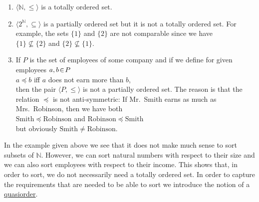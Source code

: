 \examples
\begin{enumerate}
\item $\langle\mathbb{N}, \leq \rangle$ is a totally ordered set.
\item $\langle 2^{\mathbb{N}}, \subseteq \rangle$ is a partially ordered set but it is not a totally
      ordered set.  For example, the sets $\{1\}$ and $\{2\}$ are not comparable since we have
      \\[0.2cm]
      \hspace*{1.3cm}
      $\{1\} \not\subseteq \{2\}$ \quad and \quad  $\{2\} \not\subseteq \{1\}$.
\item If $P$ is the set of employees of some company and if we define for given employees
      $a,b \!\in\! P$
      \\[0.2cm]
      \hspace*{1.3cm}
      $a \preceq b$ \quad iff \quad  $a$ does not earn more than $b$, 
      \\[0.2cm]
      then the pair $\langle P, \leq \rangle$ is not a partially ordered set.  The reason is that
      the relation $\preceq$ is not anti-symmetric:  If Mr.~Smith earns as much as
      Mrs.~Robinson, then we have both
      \\[0.2cm]
      \hspace*{1.3cm}
      $\mathrm{Smith} \preceq \mathrm{Robinson}$ \quad and \quad $\mathrm{Robinson} \preceq \mathrm{Smith}$
      \\[0.2cm]
      but obviously $\mathrm{Smith} \not= \mathrm{Robinson}$.
\end{enumerate}
In the example given above we see that it does not make much sense to sort subsets of $\mathbb{N}$.
However, we can sort natural numbers with respect to their size and we can also sort employees with
respect to their income.  This shows that, in order to sort,  we do not necessarily need a totally
ordered set.  In order to capture the requirements that are needed to be able to sort we introduce
the notion of a \href{http://en.wikipedia.org/wiki/Preorder}{quasiorder}.
\pagebreak

